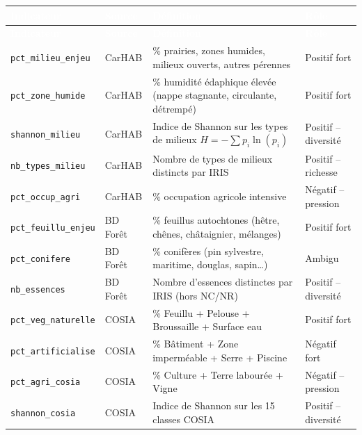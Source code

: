 \documentclass[12pt,a4paper]{report}
\begin{document}
\begin{longtable}{L{3cm} L{1.8cm} L{5cm} L{2.5cm}}
  \toprule
  \textcolor{white}{\textbf{Indicateur}} &
  \textcolor{white}{\textbf{Source}} &
  \textcolor{white}{\textbf{Définition}} &
  \textcolor{white}{\textbf{Rôle}} \\
  \midrule
  \endfirsthead
  \toprule
  \textcolor{white}{\textbf{Indicateur}} &
  \textcolor{white}{\textbf{Source}} &
  \textcolor{white}{\textbf{Définition}} &
  \textcolor{white}{\textbf{Rôle}} \\
  \midrule
  \endhead
  \bottomrule
  \endfoot

  \texttt{pct\_milieu\_enjeu} & CarHAB &
    \% prairies, zones humides, milieux ouverts, autres pérennes & Positif fort \\

  \texttt{pct\_zone\_humide} & CarHAB &
    \% humidité édaphique élevée (nappe stagnante, circulante, détrempé) & Positif fort \\

  \texttt{shannon\_milieu} & CarHAB &
    Indice de Shannon sur les types de milieux $H = -\sum p_i \ln(p_i)$ & Positif -- diversité \\

  \texttt{nb\_types\_milieu} & CarHAB &
    Nombre de types de milieux distincts par IRIS & Positif -- richesse \\

  \texttt{pct\_occup\_agri} & CarHAB &
    \% occupation agricole intensive & Négatif -- pression \\

  \texttt{pct\_feuillu\_enjeu} & BD Forêt &
    \% feuillus autochtones (hêtre, chênes, châtaignier, mélanges) & Positif fort \\

  \texttt{pct\_conifere} & BD Forêt &
    \% conifères (pin sylvestre, maritime, douglas, sapin\ldots) & Ambigu \\

  \texttt{nb\_essences} & BD Forêt &
    Nombre d'essences distinctes par IRIS (hors NC/NR) & Positif -- diversité \\

  \texttt{pct\_veg\_naturelle} & COSIA &
    \% Feuillu + Pelouse + Broussaille + Surface eau & Positif fort \\

  \texttt{pct\_artificialise} & COSIA &
    \% Bâtiment + Zone imperméable + Serre + Piscine & Négatif fort \\

  \texttt{pct\_agri\_cosia} & COSIA &
    \% Culture + Terre labourée + Vigne & Négatif -- pression \\

  \texttt{shannon\_cosia} & COSIA &
    Indice de Shannon sur les 15 classes COSIA & Positif -- diversité \\
\end{longtable}
\end{document}
